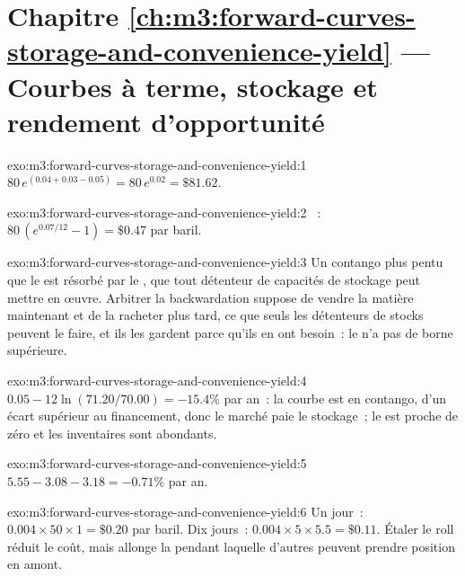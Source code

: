 \section*{Chapitre \ref{ch:m3:forward-curves-storage-and-convenience-yield} --- Courbes à terme, stockage et rendement d'opportunité}

\begin{solution}{exo:m3:forward-curves-storage-and-convenience-yield:1}
$80\,e^{(0.04 + 0.03 - 0.05)} = 80\,e^{0.02} = \$81.62$.
\end{solution}

\begin{solution}{exo:m3:forward-curves-storage-and-convenience-yield:2}
~: $80\,(e^{0.07/12} - 1) = \$0.47$ par baril.
\end{solution}

\begin{solution}{exo:m3:forward-curves-storage-and-convenience-yield:3}
Un contango plus pentu que le  est résorbé par le , que
tout détenteur de capacités de stockage peut mettre en œuvre. Arbitrer la backwardation suppose de vendre la matière maintenant et de la racheter plus tard, ce que seuls
les détenteurs de stocks peuvent le faire, et ils les gardent parce qu'ils en ont besoin~: le
 n'a pas de borne supérieure.
\end{solution}

\begin{solution}{exo:m3:forward-curves-storage-and-convenience-yield:4}
$0.05 - 12\ln(71.20/70.00) = -15.4\%$ par an~: la courbe est en contango, d'un écart supérieur au financement, donc le
marché paie le stockage~; le  est proche de zéro et les inventaires sont abondants.
\end{solution}

\begin{solution}{exo:m3:forward-curves-storage-and-convenience-yield:5}
$5.55 - 3.08 - 3.18 = -0.71\%$ par an.
\end{solution}

\begin{solution}{exo:m3:forward-curves-storage-and-convenience-yield:6}
Un jour~: $0.004 \times 50 \times 1 = \$0.20$ par baril. Dix jours~: $0.004 \times 5 \times 5.5 = \$0.11$.
Étaler le roll réduit le coût, mais allonge la  pendant laquelle d'autres peuvent prendre position en amont.
\end{solution}

